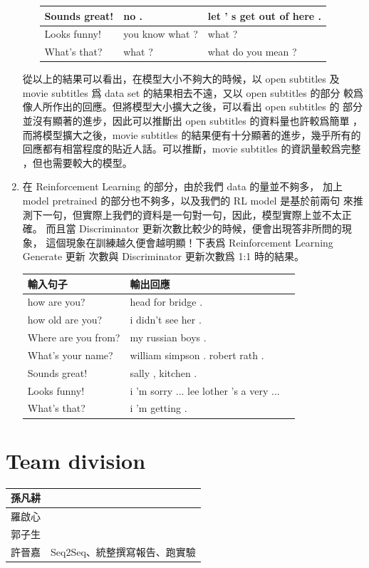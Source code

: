 \documentclass[12pt, a4paper]{article}
\theoremstyle{mystyle}	%
\begin{document}
\begin{enumerate}
\begin{enumerate}
\begin{tabular}{lll}
      \hline
      Sounds great!       & no .                      & let ' s get out of here . \\
      \hline
      Looks funny!        & you know what ?           & what ? \\
      \hline
      What's that?        & what ?                    & what do you mean ? \\
      \hline
    \end{tabular}
  \end{enumerate}
  從以上的結果可以看出，在模型大小不夠大的時候，以 open subtitles 及
  movie subtitles 爲 data set 的結果相去不遠，又以 open subtitles 的部分
  較爲像人所作出的回應。但將模型大小擴大之後，可以看出 open subtitles 的
  部分並沒有顯著的進步，因此可以推斷出 open subtitles 的資料量也許較爲簡單
  ，而將模型擴大之後，movie subtitles 的結果便有十分顯著的進步，幾乎所有的
  回應都有相當程度的貼近人話。可以推斷，movie subtitles 的資訊量較爲完整
  ，但也需要較大的模型。
\item 在 Reinforcement Learning 的部分，由於我們 data 的量並不夠多，
  加上 model pretrained 的部分也不夠多，以及我們的 RL model 是基於前兩句
  來推測下一句，但實際上我們的資料是一句對一句，因此，模型實際上並不太正確。
  而且當 Discriminator 更新次數比較少的時候，便會出現答非所問的現象，
  這個現象在訓練越久便會越明顯！下表爲 Reinforcement Learning Generate 更新
  次數與 Discriminator 更新次數爲 1:1 時的結果。 \\
  \begin{tabular}{lll}
    \hline
    輸入句子            & 輸出回應        \\
    \hline
    \hline
    how are you?        & head for bridge .          \\
    \hline
    how old are you?    & i didn't see her .         \\
    \hline
    Where are you from? & my russian boys .          \\
    \hline
    What's your name?   & william simpson . robert rath . \\
    \hline
    Sounds great!       & sally , kitchen .            \\
    \hline
    Looks funny!        & i 'm sorry ... lee lother 's a very ...     \\
    \hline
    What's that?        & i 'm getting . \\
    \hline
  \end{tabular}
\end{enumerate}

\section{Team division}
\begin{table}[h]
\centering
\begin{tabular}{ |C{2cm}|C{10cm}| }
  \hline
  孫凡耕 & \\
  \hline
  羅啟心 & \\
  \hline
  郭子生 & \\
  \hline
  許晉嘉 & Seq2Seq、統整撰寫報告、跑實驗\\
  \hline
\end{tabular}
\end{table}
\end{document}
